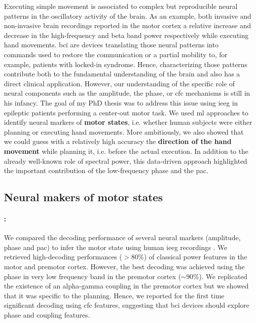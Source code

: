 \documentclass[a4paper,11pt]{article}
\begin{document}
\begin{multicols}{2}

Executing simple movement is associated to complex but reproducible neural patterns in the oscillatory activity of the brain. As an example, both invasive and non-invasive brain recordings reported in the motor cortex a relative increase and decrease in the high-frequency and beta band power respectively while executing hand movements. \Ac{bci} are devices translating those neural patterns into commands used to restore the communication or a partial mobility to, for example, patients with locked-in syndrome. Hence, characterizing those patterns contribute both to the fundamental understanding of the brain and also has a direct clinical application. However, our understanding of the specific role of neural components such as the amplitude, the phase, or \ac{cfc} mechanisms is still in his infancy.
The goal of my PhD thesis was to address this issue using \ac{ieeg} in epileptic patients performing a center-out motor task. We used \ac{ml} approaches to identify neural markers of \textbf{motor states}, i.e. whether human subjects were either planning or executing hand movements. More ambitiously, we also showed that we could guess with a relatively high accuracy the \textbf{direction of the hand movement} while planning it, i.e. before the actual execution. In addition to the already well-known role of spectral power, this data-driven approach highlighted the important contribution of the low-frequency phase and the \ac{pac}.



\subsection{Neural makers of motor states}

\paragraph{\cite{combrisson2017intentions} :} We compared the decoding performance of several neural markers (amplitude, phase and \ac{pac}) to infer the motor state using human \ac{ieeg} recordings . We retrieved high-decoding performances ($>80\%$) of classical power features in the motor and premotor cortex. However, the best decoding was achieved using the phase in very low frequency band in the premotor cortex ($\sim90\%$). We replicated the existence of an alpha-gamma coupling in the premotor cortex \citep{yanagisawa2012jon} but we showed that it was specific to the planning. Hence, we reported for the first time significant decoding using \ac{cfc} features, suggesting that \ac{bci} devices should explore phase and coupling features.


\end{multicols}
\end{document}
